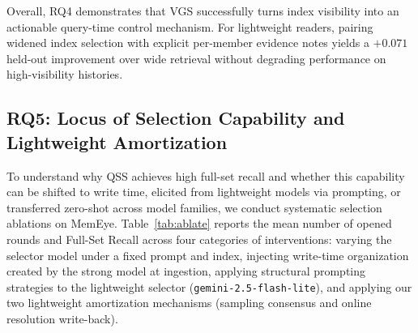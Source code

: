 \documentclass[10pt]{article}
\newcommand{\qss}{QSS}
\begin{document}
Overall, RQ4 demonstrates that VGS successfully turns index visibility into an actionable query-time control mechanism. For lightweight readers, pairing widened index selection with explicit per-member evidence notes yields a $+0.071$ held-out improvement over wide retrieval without degrading performance on high-visibility histories.

\subsection{RQ5: Locus of Selection Capability and Lightweight Amortization}
\label{sec:rq5}

To understand why \qss{} achieves high full-set recall and whether this capability can be shifted to write time, elicited from lightweight models via prompting, or transferred zero-shot across model families, we conduct systematic selection ablations on MemEye. Table~\ref{tab:ablate} reports the mean number of opened rounds and Full-Set Recall across four categories of interventions: varying the selector model under a fixed prompt and index, injecting write-time organization created by the strong model at ingestion, applying structural prompting strategies to the lightweight selector (\texttt{gemini-2.5-flash-lite}), and applying our two lightweight amortization mechanisms (sampling consensus and online resolution write-back).
\end{document}
